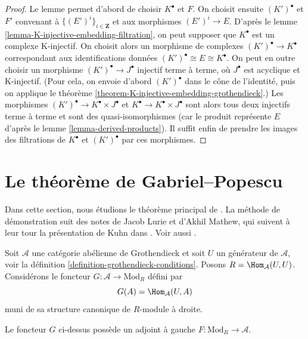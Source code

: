 \begin{proof}
Le lemme permet d'abord de choisir $K^\bullet$ et $F$. On choisit ensuite
$(K')^\bullet$ et $F'$ convenant à $\{(E')^i\}_{i \in \mathbf{Z}}$ et aux
morphismes $(E')^i \to E$. D'après le lemme
\ref{lemma-K-injective-embedding-filtration}, on peut supposer que
$K^\bullet$ est un complexe K-injectif. On choisit alors un morphisme de
complexes $(K')^\bullet \to K^\bullet$ correspondant aux identifications
données $(K')^\bullet \cong E \cong K^\bullet$. On peut en outre choisir un
morphisme $(K')^\bullet \to J^\bullet$ injectif terme à terme, où
$J^\bullet$ est acyclique et K-injectif. (Pour cela, on envoie d'abord
$(K')^\bullet$ dans le cône de l'identité, puis on applique le théorème
\ref{theorem-K-injective-embedding-grothendieck}.) Les morphismes
$(K')^\bullet \to K^\bullet \times J^\bullet$ et
$K^\bullet \to K^\bullet \times J^\bullet$ sont alors tous deux injectifs
terme à terme et sont des quasi-isomorphismes (car le produit représente $E$
d'après le lemme \ref{lemma-derived-products}). Il suffit enfin de prendre les
images des filtrations de $K^\bullet$ et $(K')^\bullet$ par ces morphismes.
\end{proof}





\section{Le théorème de Gabriel--Popescu}
\label{section-gabriel-popescu}

\noindent
Dans cette section, nous étudions le théorème principal de \cite{GP}. La
méthode de démonstration suit des notes de Jacob Lurie et d'Akhil Mathew, qui
suivent à leur tour la présentation de Kuhn dans \cite{Kuhn}. Voir aussi
\cite{Takeuchi}.

\medskip\noindent
Soit $\mathcal{A}$ une catégorie abélienne de Grothendieck et soit $U$ un
générateur de $\mathcal{A}$, voir la définition
\ref{definition-grothendieck-conditions}. Posons
$R = \Hom_\mathcal{A}(U, U)$. Considérons le foncteur
$G : \mathcal{A} \to \text{Mod}_R$ défini par
$$
G(A) = \Hom_\mathcal{A}(U, A)
$$
muni de sa structure canonique de $R$-module à droite.

\begin{lemma}
\label{lemma-gabriel-popescu-left-adjoint}
Le foncteur $G$ ci-dessus possède un adjoint à gauche
$F : \text{Mod}_R \to \mathcal{A}$.
\end{lemma}

